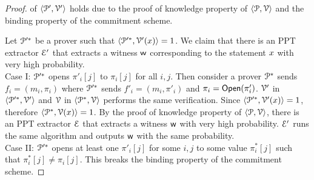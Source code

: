 \begin{proof}
	 of $\langle \mathcal{P}',\mathcal{V}'\rangle$ holds due to the proof of knowledge property of $\langle \mathcal{P},\mathcal{V}\rangle$ and the binding property of the commitment scheme.
	
	Let $\mathcal{P}'^\ast$ be a prover such that $\langle \mathcal{P}'^\ast,\mathcal{V}'({x})\rangle = 1$. We claim that there is an PPT extractor $\mathcal{E}'$ that extracts a witness $\mathsf{w}$ corresponding to the statement ${x}$ with very high probability.\\
	Case I: $\mathcal{P}'^\ast$ opens $\pi'_i[j]$ to $\pi_i[j]$ for all $i,j$. Then consider a prover $\mathcal{P}^\ast$ sends $f_i = (m_i,\pi_i)$ where  $\mathcal{P}'^\ast$ sends $f'_i = (m_i,\pi'_i)$ and $\pi_i = \mathsf{Open}(\pi'_i)$.
	$\mathcal{V}'$ in $\langle \mathcal{P}'^\ast,\mathcal{V}'\rangle$ and $\mathcal{V}$ in $\langle \mathcal{P}^\ast,\mathcal{V}\rangle$ performs the same verification. Since $\langle \mathcal{P}'^\ast,\mathcal{V}'({x})\rangle = 1$, therefore $\langle \mathcal{P}^\ast,\mathcal{V}({x})\rangle = 1$. By the proof of knowledge property of $\langle \mathcal{P},\mathcal{V}\rangle$, there is an PPT extractor $\mathcal{E}$ that extracts a witness $\mathsf{w}$ with very high probability. $\mathcal{E}'$ runs the same algorithm and outputs $\mathsf{w}$ with the same probability.\\
	Case II: $\mathcal{P}'^\ast$ opens at least one $\pi'_i[j]$ for some $i,j$ to some value $\pi^\ast_i[j]$ such that $\pi^\ast_i[j] \neq \pi_i[j]$. 
	This breaks the binding property of the commitment scheme.
	

\end{proof}
